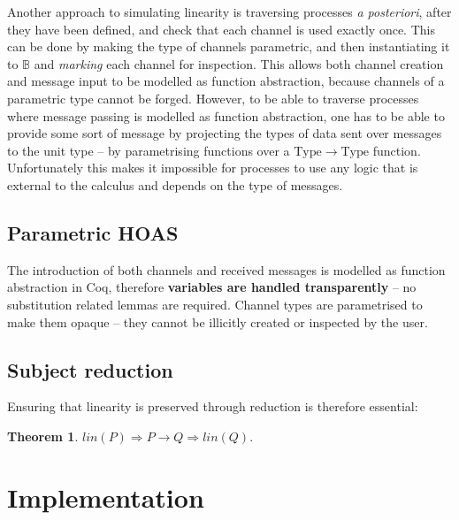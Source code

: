 \documentclass{mproj}
\newtheorem{theorem}{Theorem}
\begin{document}
Another approach to simulating linearity is traversing processes \textit{a posteriori}, after they have been defined, and check that each channel is used exactly once. This can be done by making the type of channels parametric, and then instantiating it to $\mathbb{B}$ and \textit{marking} each channel for inspection. This allows both channel creation and message input to be modelled as function abstraction, because channels of a parametric type cannot be forged.  However, to be able to traverse processes where message passing is modelled as function abstraction, one has to be able to provide some sort of message by projecting the types of data sent over messages to the unit type -- by parametrising functions over a $\mathrm{Type} \rightarrow \mathrm{Type}$ function. Unfortunately this makes it impossible for processes to use any logic that is external to the calculus and depends on the type of messages. 

\section{Parametric HOAS}\label{phoas}

\cite{Wadler1989}
\cite{Chlipala2008}

The introduction of both channels and received messages is modelled as function abstraction in Coq, therefore \textbf{variables are handled transparently} -- no substitution related lemmas are required. Channel types are parametrised to make them opaque -- they cannot be illicitly created or inspected by the user.

\section{Subject reduction}\label{subject-reduction}

Ensuring that linearity is preserved through reduction is therefore essential:
\begin{theorem}
    $lin(P) \Rightarrow P \rightarrow Q \Rightarrow lin(Q).$
\end{theorem}

\chapter{Implementation}\label{implementation}
\end{document}
